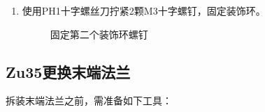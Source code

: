 \documentclass[a4paper,11pt,english,openany,oneside]{sphinxmanual}
\begin{document}
\begin{enumerate}
\item {} 
\sphinxAtStartPar
使用PH1十字螺丝刀拧紧2颗M3十字螺钉，固定装饰环。

\begin{figure}[H]
\centering
\capstart

\noindent{}
\caption{固定第二个装饰环螺钉}\label{\detokenize{_u66f4_u6362_u672b_u7aef_u6cd5_u5170:id22}}\end{figure}

\end{enumerate}


\subsection{Zu35更换末端法兰}
\label{\detokenize{_u66f4_u6362_u672b_u7aef_u6cd5_u5170:zu35}}\label{\detokenize{_u66f4_u6362_u672b_u7aef_u6cd5_u5170:id6}}
\sphinxAtStartPar
拆装末端法兰之前，需准备如下工具：
\end{document}
